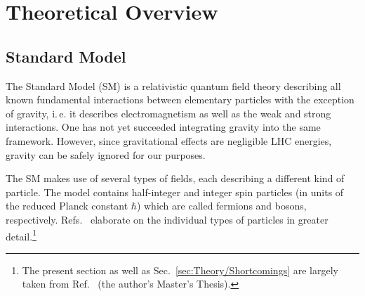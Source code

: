 \chapter{Theoretical Overview}
\label{chap:Theory}

\section{Standard Model}
The Standard Model (SM) is a relativistic quantum field theory describing all known fundamental interactions between elementary particles with the exception of gravity, i.\,e. it describes electromagnetism as well as the weak and strong interactions. One has not yet succeeded integrating gravity into the same framework. However, since gravitational effects are negligible LHC energies, gravity can be safely ignored for our purposes.

The SM makes use of several types of fields, each describing a different kind of particle. The model contains half-integer and integer spin particles (in units of the reduced Planck constant $\hbar$) which are called fermions and bosons, respectively. Refs.~\cite{i2003gauge,aitchison2003gauge} elaborate on the individual types of particles in greater detail.\footnote{The present section as well as Sec.~\ref{sec:Theory/Shortcomings} are largely taken from Ref.~\cite{Thomassen2012} (the author's Master's Thesis).}

